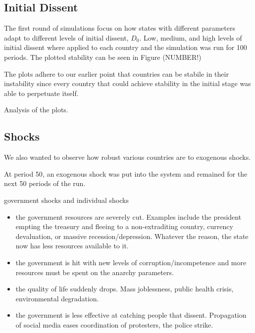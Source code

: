 \documentclass[12pt]{article}
\begin{document}
\begin{spacing}{1.5}
\subsection{Initial Dissent}

The first round of simulations focus on how states with different parameters adapt to different levels of initial dissent, $D_0$. Low, medium, and high levels of initial dissent where applied to each country and the simulation was run for 100 periods. The plotted stability can be seen in Figure (NUMBER!)


The plots adhere to our earlier point that countries can be stabile in their instability since every country that could achieve stability in the initial stage was able to perpetuate itself. 


Analysis of the plots. 

\subsection{Shocks}

We also wanted to observe how robust various countries are to exogenous shocks. 

At period 50, an exogenous shock was put into the system and remained for the next 50 periods of the run. 

government shocks and individual shocks 

\begin{itemize}
	\item {} the government resources are severely cut. Examples include the president empting the treasury and fleeing to a non-extraditing country, currency devaluation, or massive recession/depression. Whatever the reason, the state now has less resources available to it.  
	\item \boldmath{$\Omega,\Phi$:} the government is hit with new levels of corruption/incompetence and more resources must be spent on the anarchy parameters. 
	\item {} the quality of life suddenly drops. Mass joblessness, public health crisis, environmental degradation. 
	\item \boldmath{$\sigma$:} the government is less effective at catching people that dissent. Propagation of social media eases coordination of protesters, the police strike.     
\end{itemize}



\end{spacing}
\end{document}
